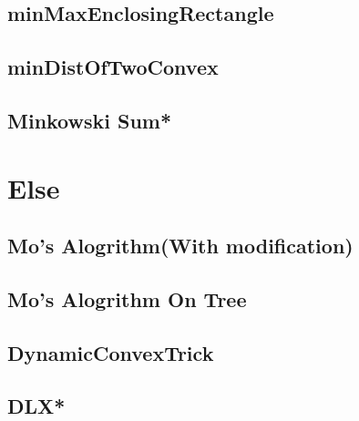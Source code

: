 \subsection{minMaxEnclosingRectangle}

\subsection{minDistOfTwoConvex}

\subsection{Minkowski Sum*} %



\section{Else}
\subsection{Mo's Alogrithm(With modification)}

\subsection{Mo's Alogrithm On Tree}

\subsection{DynamicConvexTrick}

\subsection{DLX*} %


